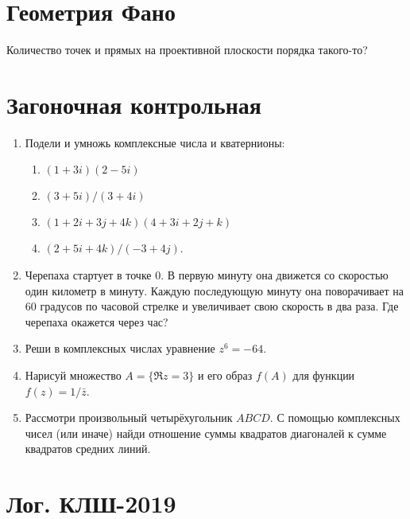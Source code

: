 \documentclass[12pt]{article}
\theoremstyle{definition}
\begin{document}
\newpage
\section{Геометрия Фано}


Количество точек и прямых на проективной плоскости порядка такого-то?


\section{Загоночная контрольная}


\begin{enumerate}
  \item Подели и умножь комплексные числа и кватернионы: 
  \begin{multicols}{2}
  \begin{enumerate}
      \item $(1+3i)(2-5i)$ 
      \item $(3+5i)/(3+4i)$
      \item $(1+2i+3j+4k)(4+3i+2j+k)$
      \item $(2+5i+4k)/(-3+4j)$.
  \end{enumerate}
  \end{multicols}
  \item Черепаха стартует в точке $0$. В первую минуту она движется со скоростью один километр в минуту.
  Каждую последующую минуту она поворачивает на 60 градусов по часовой стрелке и увеличивает свою скорость в два раза. 
  Где черепаха окажется через час?
  \item Реши в комплексных числах уравнение $z^6 = -64$.
  \item Нарисуй множество $A =\{ \Re z = 3 \}$ и его образ $f(A)$ для функции $f(z) = 1/\bar z$.
  \item Рассмотри произвольный четырёхугольник $ABCD$. 
  С помощью комплексных чисел (или иначе) найди отношение суммы квадратов диагоналей к сумме квадратов средних линий.

\end{enumerate}


\section{Лог. КЛШ-2019}
\end{document}
